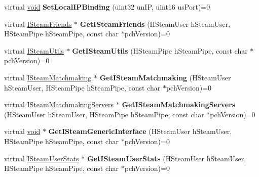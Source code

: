 \begin{DoxyCompactItemize}
\item 
\hypertarget{classISteamClient_acaee3078223ff010a46fbe5bee6a7881}{}virtual \hyperlink{SDL__audio_8h_a52835ae37c4bb905b903cbaf5d04b05f}{void} {\bfseries Set\+Local\+I\+P\+Binding} (uint32 un\+I\+P, uint16 us\+Port)=0\label{classISteamClient_acaee3078223ff010a46fbe5bee6a7881}

\item 
\hypertarget{classISteamClient_a1eb67def9a75c7cf14074603e4b44c7f}{}virtual \hyperlink{classISteamFriends}{I\+Steam\+Friends} $\ast$ {\bfseries Get\+I\+Steam\+Friends} (H\+Steam\+User h\+Steam\+User, H\+Steam\+Pipe h\+Steam\+Pipe, const char $\ast$pch\+Version)=0\label{classISteamClient_a1eb67def9a75c7cf14074603e4b44c7f}

\item 
\hypertarget{classISteamClient_a3c523da8128b20dddde198d356ace3d7}{}virtual \hyperlink{classISteamUtils}{I\+Steam\+Utils} $\ast$ {\bfseries Get\+I\+Steam\+Utils} (H\+Steam\+Pipe h\+Steam\+Pipe, const char $\ast$pch\+Version)=0\label{classISteamClient_a3c523da8128b20dddde198d356ace3d7}

\item 
\hypertarget{classISteamClient_a8d9bed8c5c37dace44183b979787b413}{}virtual \hyperlink{classISteamMatchmaking}{I\+Steam\+Matchmaking} $\ast$ {\bfseries Get\+I\+Steam\+Matchmaking} (H\+Steam\+User h\+Steam\+User, H\+Steam\+Pipe h\+Steam\+Pipe, const char $\ast$pch\+Version)=0\label{classISteamClient_a8d9bed8c5c37dace44183b979787b413}

\item 
\hypertarget{classISteamClient_a1d0ed3637f3ae4676b17e7f8c97ffd11}{}virtual \hyperlink{classISteamMatchmakingServers}{I\+Steam\+Matchmaking\+Servers} $\ast$ {\bfseries Get\+I\+Steam\+Matchmaking\+Servers} (H\+Steam\+User h\+Steam\+User, H\+Steam\+Pipe h\+Steam\+Pipe, const char $\ast$pch\+Version)=0\label{classISteamClient_a1d0ed3637f3ae4676b17e7f8c97ffd11}

\item 
\hypertarget{classISteamClient_aad3b43b98208df31ed17b1f25eaf851e}{}virtual \hyperlink{SDL__audio_8h_a52835ae37c4bb905b903cbaf5d04b05f}{void} $\ast$ {\bfseries Get\+I\+Steam\+Generic\+Interface} (H\+Steam\+User h\+Steam\+User, H\+Steam\+Pipe h\+Steam\+Pipe, const char $\ast$pch\+Version)=0\label{classISteamClient_aad3b43b98208df31ed17b1f25eaf851e}

\item 
\hypertarget{classISteamClient_a9de6d0cc891d7d7b197030008c2760e0}{}virtual \hyperlink{classISteamUserStats}{I\+Steam\+User\+Stats} $\ast$ {\bfseries Get\+I\+Steam\+User\+Stats} (H\+Steam\+User h\+Steam\+User, H\+Steam\+Pipe h\+Steam\+Pipe, const char $\ast$pch\+Version)=0\label{classISteamClient_a9de6d0cc891d7d7b197030008c2760e0}


\end{DoxyCompactItemize}
